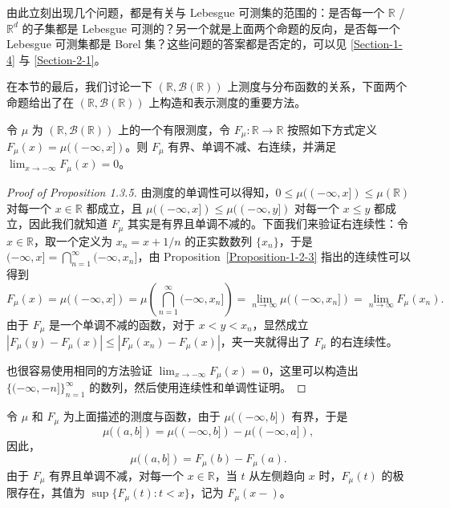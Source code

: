 \documentclass[11pt]{article}
\newcommand{\RR}{\mathbb{R}}
\newcommand{\calB}{\mathcal{B}}
\begin{document}
由此立刻出现几个问题，都是有关与 Lebesgue 可测集的范围的：是否每一个 $\RR$ / $\RR^d$ 的子集都是 Lebesgue 可测的？另一个就是上面两个命题的反向，是否每一个 Lebesgue 可测集都是 Borel 集？这些问题的答案都是否定的，可以见 \ref{Section-1-4} 与 \ref{Section-2-1}。

在本节的最后，我们讨论一下 $(\RR,\calB(\RR))$ 上测度与分布函数的关系，下面两个命题给出了在 $(\RR,\calB(\RR))$ 上构造和表示测度的重要方法。

\begin{proposition}
    令 $\mu$ 为 $(\RR,\calB(\RR))$ 上的一个有限测度，令 $F_\mu:\RR \to \RR$ 按照如下方式定义 $F_\mu(x) = \mu((-\infty,x])$。则 $F_\mu$ 有界、单调不减、右连续，并满足 $\lim_{x\to-\infty} F_\mu(x) = 0$。
\end{proposition}

\begin{proof}[Proof of Proposition 1.3.5]
    由测度的单调性可以得知，$0 \le \mu((-\infty,x]) \le \mu(\RR)$ 对每一个 $x \in \RR$ 都成立，且 $\mu((-\infty,x]) \le \mu((-\infty,y])$ 对每一个 $x \le y$ 都成立，因此我们就知道 $F_\mu$ 其实是有界且单调不减的。下面我们来验证右连续性：令 $x \in \RR$，取一个定义为 $x_n = x + 1/n$ 的正实数数列 $\{x_n\}$，于是 $(-\infty,x] = \bigcap_{n=1}^{\infty} (-\infty,x_n]$，由 Proposition~\ref{Proposition-1-2-3} 指出的连续性可以得到
    \[
        F_\mu(x)
        = \mu((-\infty,x])
        = \mu\left(\bigcap_{n=1}^{\infty} (-\infty,x_n]\right)
        = \lim_{n\to\infty}\mu((-\infty,x_n])
        = \lim_{n\to\infty} F_\mu(x_n).
    \]
    由于 $F_\mu$ 是一个单调不减的函数，对于 $x < y < x_n$，显然成立 $|F_\mu(y)-F_\mu(x)| \le |F_\mu(x_n)-F_\mu(x)|$，夹一夹就得出了 $F_\mu$ 的右连续性。

    也很容易使用相同的方法验证 $\lim_{x\to-\infty} F_\mu(x)=0$，这里可以构造出 $\{(-\infty,-n]\}_{n=1}^{\infty}$ 的数列，然后使用连续性和单调性证明。
\end{proof}

令 $\mu$ 和 $F_\mu$ 为上面描述的测度与函数，由于 $\mu((-\infty,b])$ 有界，于是
\begin{equation}\label{1-3-Equation-3}
    \mu((a,b]) = \mu((-\infty,b]) - \mu((-\infty,a]),
\end{equation}
因此，
\begin{equation}\label{1-3-Equation-4}
    \mu((a,b]) = F_\mu(b) - F_\mu(a).
\end{equation}
由于 $F_\mu$ 有界且单调不减，对每一个 $x \in \RR$，当 $t$ 从左侧趋向 $x$ 时，$F_\mu(t)$ 的极限存在，其值为 $\sup\{F_\mu(t): t<x\}$，记为 $F_\mu(x-)$。
\end{document}
